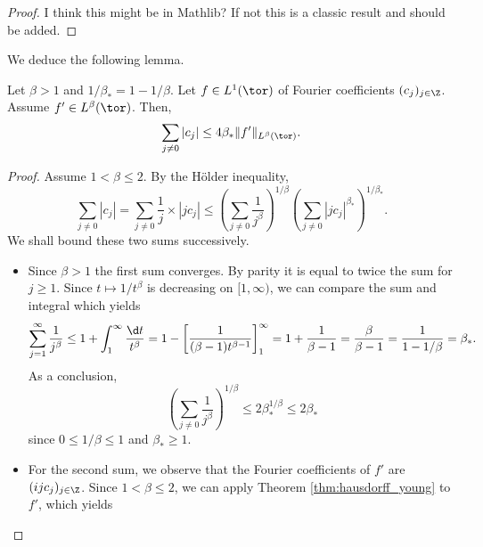 \begin{proof}
  I think this might be in Mathlib? If not this is a classic result and should be added.
\end{proof}

We deduce the following lemma.

\begin{lemma}
  \label{lem:Zygmund}
  Let $\beta > 1$ and $1/\beta_* = 1-1/\beta$.
  Let $f \in L^1(\tor)$ of Fourier coefficients $(c_j)_{j \in \Z}$.
  Assume $f' \in L^\beta(\tor)$.
  Then,
  \begin{equation*}
    \sum_{j \neq 0} |c_j| \leq 4 \beta_* \|f' \|_{L^\beta(\tor)}.
  \end{equation*}
\end{lemma}

\begin{proof}
  Assume $1 < \beta \leq 2$.
  By the H\"older inequality,
  \begin{equation*}
    \sum_{j \neq 0} |c_j|
    = \sum_{j \neq 0} \frac{1}{j} \times |j c_j|
    \leq
    \left(\sum_{j \neq 0} \frac{1}{j^\beta} \right)^{1/\beta}
    \left(\sum_{j \neq 0} |j c_j|^{\beta_*} \right)^{1/\beta_*}.
  \end{equation*}
  We shall bound these two sums successively.
  \begin{itemize}
    \item   Since $\beta>1$ the first sum converges. By parity it is equal to twice the sum for $j \geq 1$.
  Since $t \mapsto 1/t^\beta$
  is decreasing on $[1,\infty)$, we can compare the sum and integral which yields
  \begin{equation*}
    \sum_{j =1}^\infty \frac{1}{j^\beta}
    \leq 1 + \int_1^\infty \frac{\d t}{t^\beta}
    = 1 - \left[ \frac{1}{(\beta-1)t^{\beta-1}} \right]_1^\infty
    = 1 + \frac{1}{\beta - 1}
    = \frac{\beta}{\beta - 1} = \frac{1}{1 - 1/\beta} = \beta_*.
  \end{equation*}
  As a conclusion,
  \begin{equation*}
    \left(\sum_{j \neq 0} \frac{1}{j^\beta} \right)^{1/\beta}
    \leq 2 \beta_*^{1/\beta} \leq 2 \beta_*
  \end{equation*}
  since $0 \leq 1/\beta \leq 1$ and $\beta_* \geq 1$.
  \item For the second sum, we observe that the Fourier coefficients of $f'$
  are $(i j c_j)_{j \in \Z}$. Since $1 < \beta \leq 2$, we can
  apply Theorem \ref{thm:hausdorff_young} to $f'$, which yields
  \begin{equation*}

\end{equation*}
\end{itemize}
\end{proof}

